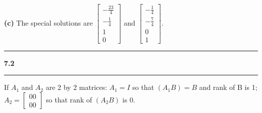 \documentclass[11pt]{article}
\newcommand\question[2]{\vspace{.25in}\hrule\textbf{#1 #2}\vspace{.5em}\hrule\vspace{.10in}}
\renewcommand\part[1]{\vspace{.10in}\textbf{(#1)}}
\begin{document}
\part{c} The special solutions are \(\begin{bmatrix} -\frac{23}{4} \\ -\frac{1}{4} \\ 1 \\ 0 \end{bmatrix}\) and \(\begin{bmatrix} -\frac{1}{4} \\ -\frac{7}{4} \\ 0 \\ 1 \end{bmatrix}\).

\question{7.2}{}
If \(A_1\) and \(A_2\) are 2 by 2 matrices:
\(A_1 = I\) so that \((A_1B) = B\) and rank of B is 1;
\(A_2 = \begin{bmatrix} 0 0 \\ 0 0 \end{bmatrix}\) so that rank of \((A_2B)\) is 0. 
\end{document}
